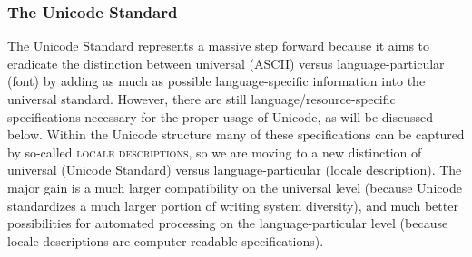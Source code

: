 \subsubsection*{The Unicode Standard}

The Unicode Standard represents a massive step forward because it aims to
eradicate the distinction between universal (ASCII) versus language-particular
(font) by adding as much as possible language-specific information into the
universal standard. However, there are still language/resource-specific
specifications necessary for the proper usage of Unicode, as will be discussed
below. Within the Unicode structure many of these specifications can be captured
by so-called \textsc{locale descriptions}, so we are moving to a new distinction
of universal (Unicode Standard) versus language-particular (locale description).
The major gain is a much larger compatibility on the universal level (because
Unicode standardizes a much larger portion of writing system diversity), and
much better possibilities for automated processing on the language-particular
level (because locale descriptions are computer readable specifications).

